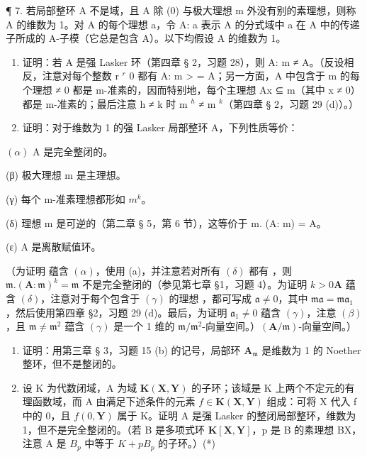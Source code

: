 ¶ 7. 若局部整环 A 不是域，且 A 除 (0) 与极大理想 m 外没有别的素理想，则称 A 的维数为 1。对 A 的每个理想 a，令 A: a 表示 A 的分式域中 a 在 A 中的传递子所成的 A-子模（它总是包含 A）。以下均假设 A 的维数为 1。

\begin{enumerate}
\def\labelenumi{(\alph{enumi})}
\item
  证明：若 A 是强 Lasker 环（第四章 § 2，习题 28），则 A: m ≠ A。（反设相反，注意对每个整数 r \(^{r}\) 0 都有 A: m \textgreater{} = A；另一方面，A 中包含于 m 的每个理想 ≠ 0 都是 m-准素的，因而特别地，每个主理想 Ax ⊆ m（其中 x ≠ 0）都是 m-准素的；最后注意 h ≠ k 时 m \(^{h}\) ≠ m \(^{k}\)（第四章 § 2，习题 29 (d)）。）
\item
  证明：对于维数为 1 的强 Lasker 局部整环 A，下列性质等价：
\end{enumerate}

\((\alpha)\) A 是完全整闭的。

(β) 极大理想 m 是主理想。

(γ) 每个 m-准素理想都形如 \(m^{k}\)。

(δ) 理想 m 是可逆的（第二章 § 5，第 6 节），这等价于 m. (A: m) = A。

(ε) A 是离散赋值环。

（为证明  蕴含 \((\alpha)\)，使用 (a)，并注意若对所有 \((\delta)\) 都有 ，则 \(\mathfrak{m}.\left(\mathbf{A}:\mathfrak{m}\right)^k = \mathfrak{m}\) 不是完全整闭的（参见第七章 §1，习题 4）。为证明 \(k > 0\)\(\mathbf{A}\) 蕴含 \((\delta)\)，注意对于每个包含于 \((\gamma)\) 的理想 ，都可写成 \(\mathfrak{a} \neq 0\)，其中 \(\mathfrak{m}\)\(\mathfrak{a} = \mathfrak{ma}_1\)，然后使用第四章 §2，习题 29 (d)。最后，为证明 \(\mathfrak{a}_1 \neq 0\) 蕴含 \((\gamma)\)，注意 \((\beta)\)，且 \(\mathfrak{m} \neq \mathfrak{m}^2\) 蕴含 \((\gamma)\) 是一个 1 维的 \(\mathfrak{m} / \mathfrak{m}^2\)-向量空间。）\((\mathbf{A} / \mathfrak{m})\)-向量空间。）

\begin{enumerate}
\def\labelenumi{(\alph{enumi})}
\setcounter{enumi}{2}
\item
  证明：用第三章 § 3，习题 15 (b) 的记号，局部环 \(\mathbf{A}_{\mathfrak{m}}\) 是维数为 1 的 Noether 整环，但不是整闭的。
\item
  设 K 为代数闭域，A 为域 \(\mathbf{K}(\mathbf{X},\mathbf{Y})\) 的子环；该域是 K 上两个不定元的有理函数域，而 A 由满足下述条件的元素 \(f\in\mathbf{K}(\mathbf{X},\mathbf{Y})\) 组成：可将 X 代入 f 中的 0，且 \(f(0,\mathbf{Y})\) 属于 K。证明 A 是强 Lasker 的整闭局部整环，维数为 1，但不是完全整闭的。（若 B 是多项式环 \(\mathbf{K}[\mathbf{X},\mathbf{Y}]\)，p 是 B 的素理想 BX，注意 A 是 \(B_{p}\) 中等于 \(K+pB_{p}\) 的子环。）(*)
\end{enumerate}

